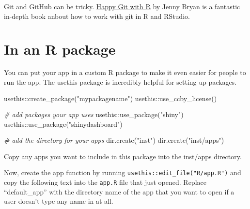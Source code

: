 \documentclass[
]{book}
\newenvironment{Shaded}{\begin{snugshade}}{\end{snugshade}}
\newcommand{\CommentTok}[1]{\textcolor[rgb]{0.56,0.35,0.01}{\textit{#1}}}
\newcommand{\FunctionTok}[1]{\textcolor[rgb]{0.00,0.00,0.00}{#1}}
\newcommand{\NormalTok}[1]{#1}
\newcommand{\SpecialCharTok}[1]{\textcolor[rgb]{0.00,0.00,0.00}{#1}}
\newcommand{\StringTok}[1]{\textcolor[rgb]{0.31,0.60,0.02}{#1}}
\begin{document}
Git and GitHub can be tricky. \href{https://happygitwithr.com/}{Happy Git with R} by Jenny Bryan is a fantastic in-depth book anbout how to work with git in R and RStudio.

\hypertarget{in-an-r-package}{%
\section{In an R package}\label{in-an-r-package}}

You can put your app in a custom R package to make it even easier for people to run the app. The usethis package is incredibly helpful for setting up packages.

\begin{Shaded}
\begin{Highlighting}[]
\NormalTok{usethis}\SpecialCharTok{::}\FunctionTok{create\_package}\NormalTok{(}\StringTok{"mypackagename"}\NormalTok{)}
\NormalTok{usethis}\SpecialCharTok{::}\FunctionTok{use\_ccby\_license}\NormalTok{()}

\CommentTok{\# add packages your app uses}
\NormalTok{usethis}\SpecialCharTok{::}\FunctionTok{use\_package}\NormalTok{(}\StringTok{"shiny"}\NormalTok{)}
\NormalTok{usethis}\SpecialCharTok{::}\FunctionTok{use\_package}\NormalTok{(}\StringTok{"shinydashboard"}\NormalTok{)}

\CommentTok{\# add the directory for your apps}
\FunctionTok{dir.create}\NormalTok{(}\StringTok{"inst"}\NormalTok{)}
\FunctionTok{dir.create}\NormalTok{(}\StringTok{"inst/apps"}\NormalTok{)}
\end{Highlighting}
\end{Shaded}

Copy any apps you want to include in this package into the inst/apps directory.

Now, create the app function by running \texttt{usethis::edit\_file("R/app.R")} and copy the following text into the \texttt{app.R} file that just opened. Replace ``default\_app'' with the directory name of the app that you want to open if a user doesn't type any name in at all.
\end{document}
